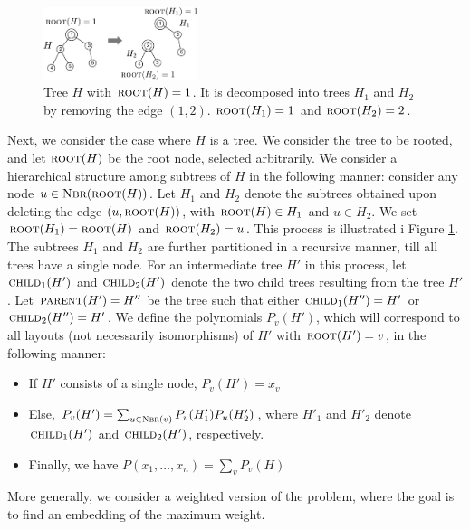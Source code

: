 \begin{figure}[h]
\includegraphics[width=0.4\textwidth]{img/trees.pdf}
\caption{
\small
Tree $H$ with $\textsc{root}(H)=1$. It is decomposed into trees $H_1$ and $H_2$ by
removing the edge $(1, 2)$. $\textsc{root}(H_1)=1$ and $\textsc{root}(H_2)=2$.
}
\label{fig:trees}
\end{figure}
Next, we consider the case where $H$ is a tree. We consider the tree to be rooted,
and let $\textsc{root}(H)$ be the root node, selected arbitrarily. We consider a hierarchical
structure among subtrees of $H$ in the following manner: consider any node $u\in\textsc{Nbr}(\textsc{root}(H))$.
Let $H_1$ and $H_2$ denote the subtrees obtained upon deleting the edge $(u, \textsc{root}(H))$,
with $\textsc{root}(H)\in H_1$ and $u\in H_2$. We set $\textsc{root}(H_1)=\textsc{root}(H)$ and $\textsc{root}(H_2)=u$.
This process is illustrated i Figure \ref{fig:trees}.
The subtrees $H_1$ and $H_2$ are further partitioned in a recursive manner, till
all trees have a single node. For an intermediate tree $H'$ in this process,
let $\textsc{child}_1(H')$ and $\textsc{child}_2(H')$ denote the two child trees
resulting from the tree $H'$. Let $\textsc{parent}(H')=H''$ be the tree such that
either $\textsc{child}_1(H'')= H'$ or $\textsc{child}_2(H'') = H'$.
We define the polynomials $P_v(H')$, which will correspond to all layouts (not necessarily
isomorphisms) of $H'$ with $\textsc{root}(H')=v$, in the following manner:
\begin{itemize}
\item
If $H'$ consists of a single node, $P_v(H') = x_v$
\item
Else, 
$P_v(H') = \sum_{u\in\textsc{Nbr}(v)} P_v(H'_1)P_u(H'_2)$, where
$H'_1$ and $H'_2$ denote $\textsc{child}_1(H')$ and $\textsc{child}_2(H')$, respectively.
\item
Finally, we have
$P(x_1,\ldots, x_n)= \sum_v P_v(H)$
\end{itemize}

More generally, we consider a weighted version of the problem, where the goal is to
find an embedding of the maximum weight. 
\fi 

